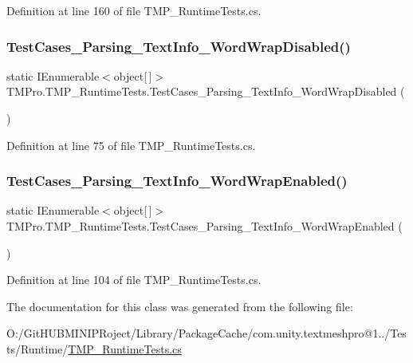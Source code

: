 Definition at line 160 of file T\+M\+P\+\_\+\+Runtime\+Tests.\+cs.

\mbox{\label{class_t_m_pro_1_1_t_m_p___runtime_tests_ad49dfc46be7b4c209e87de8cca277375}} 
\subsubsection{\texorpdfstring{TestCases\_Parsing\_TextInfo\_WordWrapDisabled()}{TestCases\_Parsing\_TextInfo\_WordWrapDisabled()}}
{\footnotesize\ttfamily static I\+Enumerable$<$object\mbox{[}$\,$\mbox{]}$>$ T\+M\+Pro.\+T\+M\+P\+\_\+\+Runtime\+Tests.\+Test\+Cases\+\_\+\+Parsing\+\_\+\+Text\+Info\+\_\+\+Word\+Wrap\+Disabled (\begin{DoxyParamCaption}{ }\end{DoxyParamCaption})\hspace{0.3cm}{\ttfamily [static]}}



Definition at line 75 of file T\+M\+P\+\_\+\+Runtime\+Tests.\+cs.

\mbox{\label{class_t_m_pro_1_1_t_m_p___runtime_tests_a375c2b367497a32f31a054c55d8bcf0c}} 
\subsubsection{\texorpdfstring{TestCases\_Parsing\_TextInfo\_WordWrapEnabled()}{TestCases\_Parsing\_TextInfo\_WordWrapEnabled()}}
{\footnotesize\ttfamily static I\+Enumerable$<$object\mbox{[}$\,$\mbox{]}$>$ T\+M\+Pro.\+T\+M\+P\+\_\+\+Runtime\+Tests.\+Test\+Cases\+\_\+\+Parsing\+\_\+\+Text\+Info\+\_\+\+Word\+Wrap\+Enabled (\begin{DoxyParamCaption}{ }\end{DoxyParamCaption})\hspace{0.3cm}{\ttfamily [static]}}



Definition at line 104 of file T\+M\+P\+\_\+\+Runtime\+Tests.\+cs.



The documentation for this class was generated from the following file\+:\begin{DoxyCompactItemize}
\item 
O\+:/\+Git\+H\+U\+B\+M\+I\+N\+I\+P\+Roject/\+Library/\+Package\+Cache/com.\+unity.\+textmeshpro@1../\+Tests/\+Runtime/\mbox{\hyperlink{_t_m_p___runtime_tests_8cs}{T\+M\+P\+\_\+\+Runtime\+Tests.\+cs}}\end{DoxyCompactItemize}
